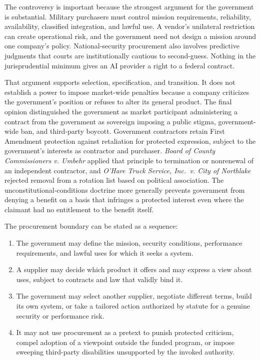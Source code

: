 The controversy is important because the strongest argument for the government is substantial. Military purchasers must control mission requirements, reliability, availability, classified integration, and lawful use. A vendor's unilateral restriction can create operational risk, and the government need not design a mission around one company's policy. National-security procurement also involves predictive judgments that courts are institutionally cautious to second-guess. Nothing in the jurisprudential minimum gives an AI provider a right to a federal contract.

That argument supports selection, specification, and transition. It does not establish a power to impose market-wide penalties because a company criticizes the government's position or refuses to alter its general product. The final opinion distinguished the government as market participant administering a contract from the government as sovereign imposing a public stigma, government-wide ban, and third-party boycott. Government contractors retain First Amendment protection against retaliation for protected expression, subject to the government's interests as contractor and purchaser. \emph{Board of County Commissioners v. Umbehr} applied that principle to termination or nonrenewal of an independent contractor, and \emph{O'Hare Truck Service, Inc.\ v. City of Northlake} rejected removal from a rotation list based on political association. The unconstitutional-conditions doctrine more generally prevents government from denying a benefit on a basis that infringes a protected interest even where the claimant had no entitlement to the benefit itself.

The procurement boundary can be stated as a sequence:

\begin{enumerate}[leftmargin=2.2em]
\item The government may define the mission, security conditions, performance requirements, and lawful uses for which it seeks a system.
\item A supplier may decide which product it offers and may express a view about uses, subject to contracts and law that validly bind it.
\item The government may select another supplier, negotiate different terms, build its own system, or take a tailored action authorized by statute for a genuine security or performance risk.
\item It may not use procurement as a pretext to punish protected criticism, compel adoption of a viewpoint outside the funded program, or impose sweeping third-party disabilities unsupported by the invoked authority.
\end{enumerate}

